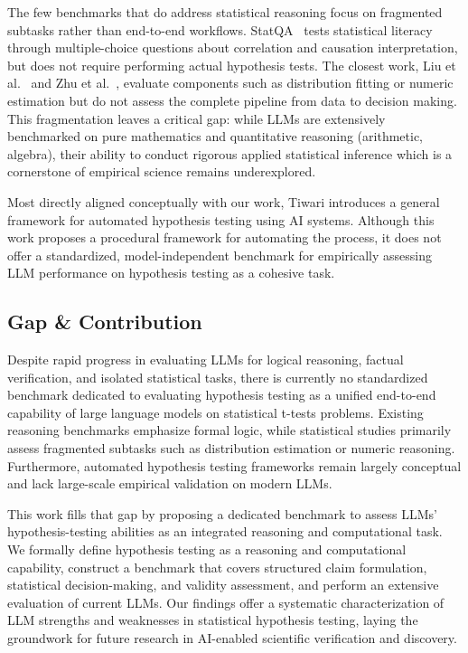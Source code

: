 \documentclass{article}
\begin{document}
The few benchmarks that do address statistical reasoning focus on fragmented subtasks rather than end-to-end workflows. StatQA~\cite{zhu2024large} tests statistical literacy through multiple-choice questions about correlation and causation interpretation, but does not require performing actual hypothesis tests. The closest work, Liu et al.~\cite{liu2024llms} and Zhu et al.~\cite{zhu2024are}, evaluate components such as distribution fitting or numeric estimation but do not assess the complete pipeline from data to decision making. This fragmentation leaves a critical gap: while LLMs are extensively benchmarked on pure mathematics and quantitative reasoning (arithmetic, algebra), their ability to conduct rigorous applied statistical inference which is a cornerstone of empirical science remains underexplored.

Most directly aligned conceptually with our work, Tiwari \cite{tiwari2025framework} introduces a general framework for automated hypothesis testing using AI systems. Although this work proposes a procedural framework for automating the process, it does not offer a standardized, model-independent benchmark for empirically assessing LLM performance on hypothesis testing as a cohesive task.

\subsection{Gap \& Contribution}
Despite rapid progress in evaluating LLMs for logical reasoning, factual verification, and isolated statistical tasks, there is currently no standardized benchmark dedicated to evaluating hypothesis testing as a unified end-to-end capability of large language models on statistical t-tests problems. Existing reasoning benchmarks emphasize formal logic, while statistical studies primarily assess fragmented subtasks such as distribution estimation or numeric reasoning. Furthermore, automated hypothesis testing frameworks remain largely conceptual and lack large-scale empirical validation on modern LLMs.

This work fills that gap by proposing a dedicated benchmark to assess LLMs' hypothesis-testing abilities as an integrated reasoning and computational task. We formally define hypothesis testing as a reasoning and computational capability, construct a benchmark that covers structured claim formulation, statistical decision-making, and validity assessment, and perform an extensive evaluation of current LLMs. Our findings offer a systematic characterization of LLM strengths and weaknesses in statistical hypothesis testing, laying the groundwork for future research in AI-enabled scientific verification and discovery.
\end{document}
